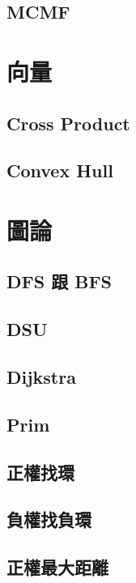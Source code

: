 \subsection{MCMF} 


\section{向量}
\subsection{Cross Product} 

\subsection{Convex Hull} 


\section{圖論}
\subsection{DFS 跟 BFS} 

\subsection{DSU} 

\subsection{Dijkstra}

\subsection{Prim}

\subsection{正權找環} 

\subsection{負權找負環} 

\subsection{正權最大距離} 

